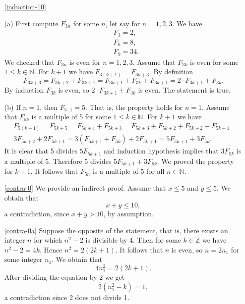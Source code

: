 \begin{enumerate}
(d) The identity to prove is as follows: 
$$
F_2+F_4+\ldots+F_{2n}=F_{2n+1}-1.
$$
If $n=1$, then the left-hand side is $F_2=1$ and the right-hand side is $F_3-1=2-1=1$. So the identity is valid.
Assume that for some $1\leq k\in\mathbb{N}$ the identity holds, that is, 
$$
F_2+F_4+\ldots+F_{2k}=F_{2k+1}-1.
$$
Let us handle the sum for $k+1$ terms, that is, the sum
$$
F_2+F_4+\ldots+F_{2k}+F_{2k+2}.
$$
It can be written as 
$$
(F_2+F_4+\ldots+F_{2k})+F_{2k+2}=F_{2k+1}-1+F_{2k+2}=F_{2k+3}-1.
$$
Thus the identity has been proved for all positive integers.

\item[\ref{induction-10}]

(a) First compute $F_{3n}$ for some $n$, let say for $n=1,2,3$.
We have
\begin{align*}
& F_3=2,\\
& F_6=8,\\
& F_9=34.
\end{align*}
We checked that $F_{3n}$ is even for $n=1,2,3$. Assume that $F_{3k}$ is even for some $1\leq k\in\mathbb{N}$. For $k+1$ we
have $F_{3(k+1)}=F_{3k+3}$. By definition
$$
F_{3k+3}=F_{3k+2}+F_{3k+1}=F_{3k+1}+F_{3k}+F_{3k+1}=2\cdot F_{3k+1}+F_{3k}.
$$
By induction $F_{3k}$ is even, so $2\cdot F_{3k+1}+F_{3k}$ is even. The statement is true.

(b) If $n=1$, then $F_{5\cdot 1}=5$. That is, the property holds for $n=1$. Assume that $F_{5k}$ is a multiple of 5 for 
some $1\leq k\in\mathbb{N}$. For $k+1$ we have
\begin{align*}
& F_{5(k+1)}=F_{5k+5}=F_{5k+4}+F_{5k+3}=F_{5k+3}+F_{5k+2}+F_{5k+2}+F_{5k+1}=\\
& 3F_{5k+2}+2F_{5k+1}=3(F_{5k+1}+F_{5k})+2F_{5k+1}=5F_{5k+1}+3F_{5k}.
\end{align*}
It is clear that 5 divides $5F_{5k+1}$ and induction hypothesis implies that $3F_{5k}$ is a multiple of 5.
Therefore 5 divides $5F_{5k+1}+3F_{5k}$. We proved the property for $k+1$. It follows that $F_{5n}$ is a multiple of 
5 for all $n \in \mathbb{N}$.



\item[\ref{contra-0}] We provide an indirect proof. Assume that $x\leq 5$ and $y\leq 5$. We obtain that
$$
x+y\leq 10,
$$
a contradiction, since $x+y>10$, by assumption.

\item[\ref{contra-0a}] Suppose the opposite of the statement, that is, there exists an integer $n$ for which $n^2-2$ is divisible by 4.
Then for some $k\in\mathbb{Z}$ we have $n^2-2=4k$. Hence $n^2=2(2k+1)$. It follows that $n$ is even, so $n=2n_1$ for some integer $n_1$.
We obtain that 
$$
4n_1^2=2(2k+1).
$$
After dividing the equation by 2 we get
$$
2(n_1^2-k)=1,
$$
a contradiction since 2 does not divide 1.


\end{enumerate}
